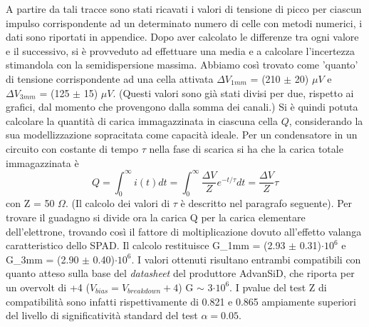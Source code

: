 \documentclass[journal]{IEEEtran}
\begin{document}
A partire da tali tracce sono stati ricavati i valori di tensione di picco per ciascun impulso corrispondente ad un determinato numero di celle con metodi numerici, i dati sono riportati in appendice. Dopo aver calcolato le differenze tra ogni valore e il successivo, si è provveduto ad effettuare una media e a calcolare l'incertezza stimandola con la semidispersione massima. Abbiamo così trovato come 'quanto' di tensione corrispondente ad una cella attivata $\Delta V_{1mm}$ = (210 $\pm$ 20) $\mu V$ e  $\Delta V_{3mm}$ = (125 $\pm$ 15) $\mu V$. (Questi valori sono già stati divisi per due, rispetto ai grafici, dal momento che provengono dalla somma dei canali.) Si è quindi potuta calcolare la quantità di carica immagazzinata in ciascuna cella $Q$, considerando la sua modellizzazione sopracitata come capacità ideale. Per un condensatore in un circuito con costante di tempo $\tau$ nella fase di scarica si ha che la carica totale immagazzinata è
\begin{equation}
    Q = \int_{0}^{\infty} i(t) dt = \int_{0}^{\infty} \frac{\Delta V}{Z} e^{-t/ \tau}  dt = \frac{\Delta V}{Z} \tau
\end{equation}
con Z = 50 $\Omega$. (Il calcolo dei valori di $\tau$ è descritto nel paragrafo seguente). Per trovare il guadagno si divide ora la carica Q per la carica elementare dell'elettrone, trovando così il fattore di moltiplicazione dovuto all'effetto valanga caratteristico dello SPAD. Il calcolo restituisce G_{1mm} = (2.93 $\pm$ 0.31)$\cdot 10^6$ e G_{3mm} = (2.90 $\pm$ 0.40)$\cdot 10^6$. I valori ottenuti risultano entrambi compatibili con quanto atteso sulla base del \textit{datasheet} del produttore AdvanSiD, che riporta per un overvolt di +4 ($V_{bias} = V_{breakdown} + 4$) G $\sim$ 3$\cdot10^6$. I pvalue del test Z di compatibilità sono infatti rispettivamente di 0.821 e 0.865 ampiamente superiori del livello di significatività standard del test $\alpha = 0.05$.
\end{document}
